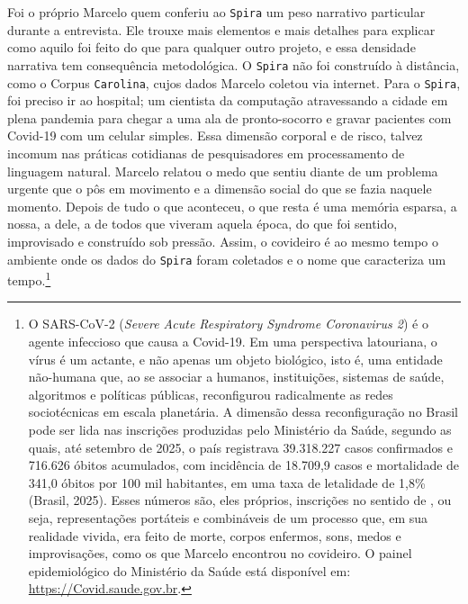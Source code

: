 Foi o próprio Marcelo quem conferiu ao \texttt{Spira} um peso narrativo particular durante a entrevista. Ele trouxe mais elementos e mais detalhes para explicar como aquilo foi feito do que para qualquer outro projeto, e essa densidade narrativa tem consequência metodológica. O \texttt{Spira} não foi construído à distância, como o Corpus \texttt{Carolina}, cujos dados Marcelo coletou via internet. Para o \texttt{Spira}, foi preciso ir ao hospital; um cientista da computação atravessando a cidade em plena pandemia para chegar a uma ala de pronto-socorro e gravar pacientes com Covid-19 com um celular simples. Essa dimensão corporal e de risco, talvez incomum nas práticas cotidianas de pesquisadores em processamento de linguagem natural. Marcelo relatou o medo que sentiu diante de um problema urgente que o pôs em movimento e a dimensão social do que se fazia naquele momento. Depois de tudo o que aconteceu, o que resta é uma memória esparsa, a nossa, a dele, a de todos que viveram aquela época, do que foi sentido, improvisado e construído sob pressão. Assim, o covideiro é ao mesmo tempo o ambiente onde os dados do \texttt{Spira} foram coletados e o nome que caracteriza um tempo.\footnote{O SARS-CoV-2 (\textit{Severe Acute Respiratory Syndrome Coronavirus 2}) é o agente infeccioso que causa a Covid-19. Em uma perspectiva latouriana, o vírus é um actante, e não apenas um objeto biológico, isto é, uma entidade não-humana que, ao se associar a humanos, instituições, sistemas de saúde, algoritmos e políticas públicas, reconfigurou radicalmente as redes sociotécnicas em escala planetária. A dimensão dessa reconfiguração no Brasil pode ser lida nas inscrições produzidas pelo Ministério da Saúde, segundo as quais, até setembro de 2025, o país registrava 39.318.227 casos confirmados e 716.626 óbitos acumulados, com incidência de 18.709,9 casos e mortalidade de 341,0 óbitos por 100 mil habitantes, em uma taxa de letalidade de 1,8\% (Brasil, 2025). Esses números são, eles próprios, inscrições no sentido de \textcite{Latour1986Visualization}, ou seja, representações portáteis e combináveis de um processo que, em sua realidade vivida, era feito de morte, corpos enfermos, sons, medos e improvisações, como os que Marcelo encontrou no covideiro. O painel epidemiológico do Ministério da Saúde está disponível em: \url{https://Covid.saude.gov.br}.}

